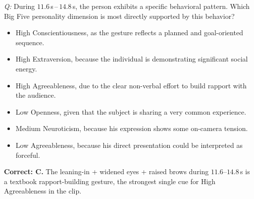 \documentclass{llmxive}
\begin{document}
\begin{examplebox}[title={(1) Personality Attribution}]
\emph{Q:} During $11.6$\,s\,--\,$14.8$\,s, the person exhibits a specific behavioral pattern. Which Big Five personality dimension is most directly supported by this behavior?
\begin{itemize}[leftmargin=1.4em, itemsep=0pt, topsep=1pt, parsep=0pt]
\item[A.] High Conscientiousness, as the gesture reflects a planned and goal-oriented sequence.
\item[B.] High Extraversion, because the individual is demonstrating significant social energy.
\item[C.] High Agreeableness, due to the clear non-verbal effort to build rapport with the audience.
\item[D.] Low Openness, given that the subject is sharing a very common experience.
\item[E.] Medium Neuroticism, because his expression shows some on-camera tension.
\item[F.] Low Agreeableness, because his direct presentation could be interpreted as forceful.
\end{itemize}
\textbf{Correct: C.}  The leaning-in + widened eyes + raised brows during $11.6$--$14.8$\,s is a textbook rapport-building gesture, the strongest single cue for High Agreeableness in the clip.
\end{examplebox}
\end{document}
